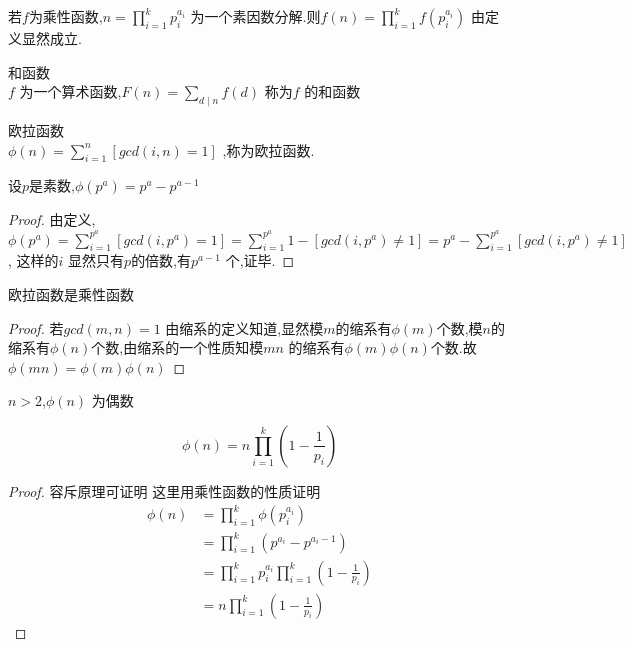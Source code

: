 \begin{proposition}
  若$f$为乘性函数,$n=\prod_{i=1}^{k} p_i^{a_i}$ 为一个素因数分解.则$f(n)=\prod_{i=1}^k f(p_i^{a_i})$
由定义显然成立.
\end{proposition}

\begin{definition}
  和函数\\
  $f$ 为一个算术函数,$F(n)=\sum_{d \mid n} f(d)$ 称为$f$ 的和函数
\end{definition}

\begin{definition}
  欧拉函数\\
  $\phi(n)=\sum_{i=1}^n [gcd(i,n)=1]$ ,称为欧拉函数.
\end{definition}

\begin{proposition}
  设$p$是素数,$\phi(p^a)=p^a-p^{a-1} $
\end{proposition}

\begin{proof}
  由定义,$\phi(p^a)= \sum_{i=1}^{p^a} [gcd(i,p^a)=1]= \sum_{i=1}^{p^a} 1-[gcd(i,p^a) \neq 1]=p^a- \sum_{i=1}^{p^a} [gcd(i,p^a) \neq 1]$,
  这样的$i$ 显然只有$p$的倍数,有$p^{a-1}$ 个,证毕.
\end{proof}

\begin{proposition}
  欧拉函数是乘性函数
\end{proposition}

\begin{proof}
  若$gcd(m,n)=1$
由缩系的定义知道,显然模$m$的缩系有$\phi(m)$个数,模$n$的缩系有$\phi(n)$个数,由缩系的一个性质知模$mn$ 的缩系有$\phi(m)\phi(n)$个数.故$\phi(mn)=\phi(m)\phi(n)$
\end{proof}

\begin{proposition}
  $n>2$,$\phi(n)$ 为偶数
\end{proposition}

\begin{proposition}
 $$
 \phi(n)=n\prod_{i=1}^k(1-\frac{1}{p_i})
 $$
\end{proposition}

\begin{proof}
  容斥原理可证明
这里用乘性函数的性质证明
$$
\begin{aligned}
  \phi(n)&=\prod_{i=1}^k \phi(p_i^{a_i})\\
  &=\prod_{i=1}^k(p^{a_i}-p^{a_i-1})\\
  &=\prod_{i=1}^{k} p_i^{a_i}\prod_{i=1}^k(1-\frac{1}{p_i})\\
  &= n\prod_{i=1}^k(1-\frac{1}{p_i})
\end{aligned}
$$
\end{proof}


